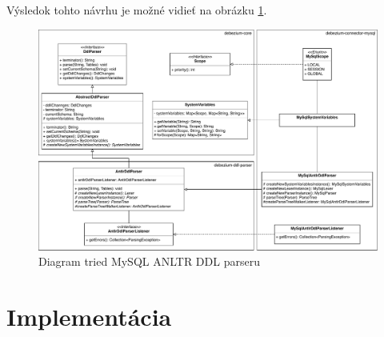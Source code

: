 Výsledok tohto návrhu je možné vidieť na obrázku \ref{fig:class_diagram_antlr}.
\begin{figure}[H]
\begin{center}
\includegraphics[width=15cm]{figures/antlr_design.pdf}
\caption{Diagram tried MySQL ANLTR DDL parseru}
\label{fig:class_diagram_antlr}
\end{center}
\end{figure}

\section{Implementácia}
